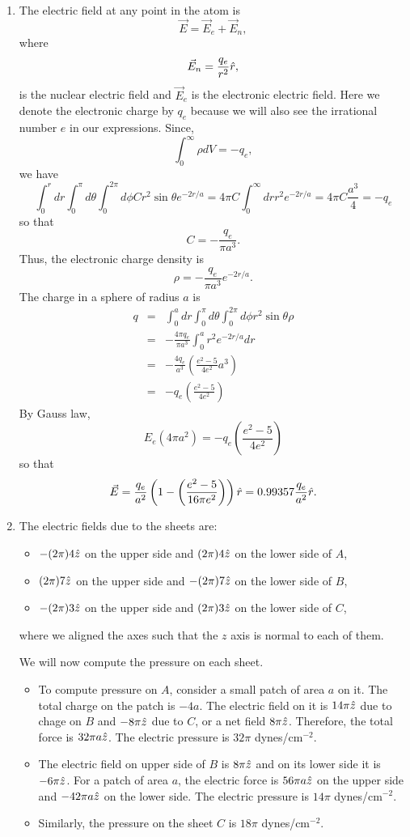 \documentclass{article}
\begin{document}
\begin{enumerate}
\item The electric field at any point in the atom is
\[
\vec{E} = \vec{E}_e + \vec{E}_n,
\]
where
\[
\vec{E}_n = \frac{q_e}{r^2}\hat{r},
\]
is the nuclear electric field and $\vec{E}_e$ is the electronic electric field.
Here we denote the electronic charge by $q_e$ because we will also see the irrational
number $e$ in our expressions. Since,
\[
\int_0^\infty \rho dV = -q_e,
\]
we have
\[
\int_0^r dr \int_0^\pi d\theta \int_0^{2\pi}d\phi Cr^2\sin\theta  e^{-2r/a} = 
4\pi C\int_0^\infty dr r^2 e^{-2r/a} = 4\pi C\frac{a^3}{4} = -q_e
\]
so that 
\[
C = -\frac{q_e}{\pi a^3}.
\]
Thus, the electronic charge density is
\[
\rho = -\frac{q_e}{\pi a^3}e^{-2r/a}.
\]
The charge in a sphere of radius $a$ is
\begin{eqnarray*}
q &=& \int_0^a dr\int_0^\pi d\theta \int_0^{2\pi}d\phi r^2\sin\theta \rho \\
 &=& -\frac{4\pi q_e}{\pi a^3}\int_0^a r^2 e^{-2r/a}dr \\
 &=& -\frac{4q_e}{a^3}\left(\frac{e^2 - 5}{4e^2}a^3\right) \\
 &=& -q_e\left(\frac{e^2 - 5}{4e^2}\right)
\end{eqnarray*}
By Gauss law,
\[
E_e(4\pi a^2) = -q_e\left(\frac{e^2 - 5}{4e^2}\right)
\]
so that
\[
\vec{E} = \frac{q_e}{a^2}\left(1 - \left(\frac{e^2 - 5}{16\pi e^2}\right)\right)\hat{r}
= 0.99357\frac{q_e}{a^2}\hat{r}.
\]

\item The electric fields due to the sheets are:
\begin{itemize}
\item $-(2\pi)4\hat{z}$ on the upper side and $(2\pi)4\hat{z}$ on the lower side of $A$,
\item $(2\pi)7\hat{z}$ on the upper side and $-(2\pi)7\hat{z}$ on the lower side of $B$,
\item $-(2\pi)3\hat{z}$ on the upper side and $(2\pi)3\hat{z}$ on the lower side of $C$,
\end{itemize}
where we aligned the axes such that the $z$ axis is normal to each of them.

We will now compute the pressure on each sheet.
\begin{itemize}
\item To compute pressure on $A$, consider a small patch of area $a$ on it. The 
total charge on the patch is $-4a$. The electric field on it is $14\pi\hat{z}$
due to chage on $B$ and $-8\pi\hat{z}$ due to $C$, or a net field $8\pi\hat{z}$.
Therefore, the total force is $32\pi a\hat{z}$. The electric pressure is $32\pi$
dynes/cm$^{-2}$.
\item The electric field on upper side of $B$ is $8\pi\hat{z}$ and on its lower 
side it is $-6\pi\hat{z}$. For a patch of area $a$, the electric force is $56\pi a
\hat{z}$ on the upper side and $-42\pi a\hat{z}$ on the lower side. The electric
pressure is $14\pi$ dynes/cm$^{-2}$.
\item Similarly, the pressure on the sheet $C$ is $18\pi$ dynes/cm$^{-2}$.
\end{itemize}


\end{enumerate}
\end{document}
